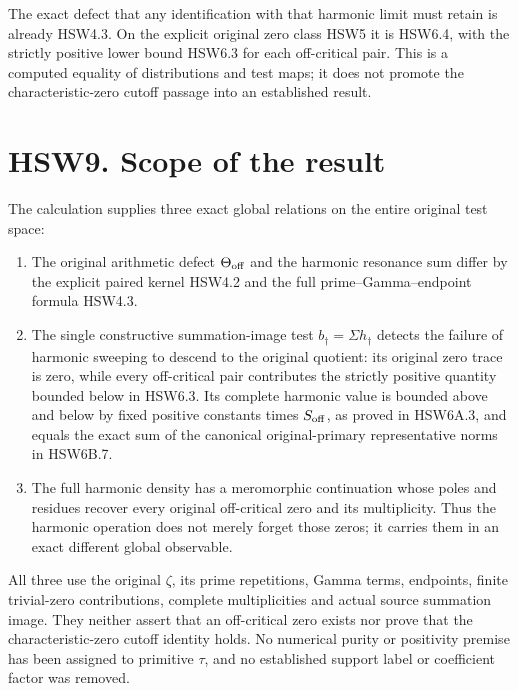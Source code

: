 The exact defect that any identification with that harmonic limit must
retain is already HSW4.3. On the explicit original zero class HSW5 it is
HSW6.4, with the strictly positive lower bound HSW6.3 for each
off-critical pair. This is a computed equality of distributions and test
maps; it does not promote the characteristic-zero cutoff passage into an
established result.

\section{HSW9. Scope of the result}\label{hsw9.-scope-of-the-result}

The calculation supplies three exact global relations on the entire
original test space:

\begin{enumerate}
\def\labelenumi{\arabic{enumi}.}
\tightlist
\item
  The original arithmetic defect \(\Theta_{\rm off}\) and the harmonic
  resonance sum differ by the explicit paired kernel HSW4.2 and the full
  prime--Gamma--endpoint formula HSW4.3.
\item
  The single constructive summation-image test
  \(b_\dagger=\Sigma h_\dagger\) detects the failure of harmonic
  sweeping to descend to the original quotient: its original zero trace
  is zero, while every off-critical pair contributes the strictly
  positive quantity bounded below in HSW6.3. Its complete harmonic value
  is bounded above and below by fixed positive constants times
  \(S_{\rm off}\), as proved in HSW6A.3, and equals the exact sum of the
  canonical original-primary representative norms in HSW6B.7.
\item
  The full harmonic density has a meromorphic continuation whose poles
  and residues recover every original off-critical zero and its
  multiplicity. Thus the harmonic operation does not merely forget those
  zeros; it carries them in an exact different global observable.
\end{enumerate}

All three use the original \(\zeta\), its prime repetitions, Gamma
terms, endpoints, finite trivial-zero contributions, complete
multiplicities and actual source summation image. They neither assert
that an off-critical zero exists nor prove that the characteristic-zero
cutoff identity holds. No numerical purity or positivity premise has
been assigned to primitive \(\tau\), and no established support label or
coefficient factor was removed.

